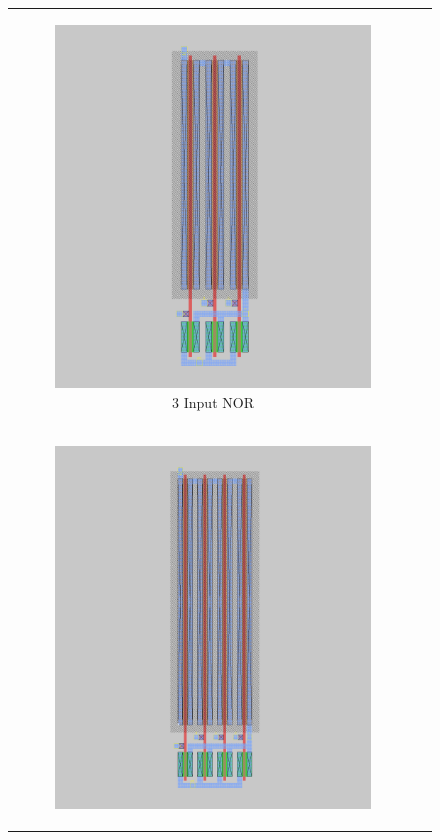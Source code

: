 \documentclass[conference]{IEEEtran}
\begin{document}
\begin{figure}[H]
\begin{tabular}{cc}
\begin{subfigure}{0.44\linewidth}
            \includegraphics[width=\textwidth]{images/nor_3_cmos_layout.png}
            \caption{3 Input NOR}
        \end{subfigure} \\
        \begin{subfigure}{0.44\linewidth}
            \centering
            \includegraphics[width=\textwidth]{images/nor_4_cmos_layout.png}

\end{subfigure}
\end{tabular}
\end{figure}
\end{document}
